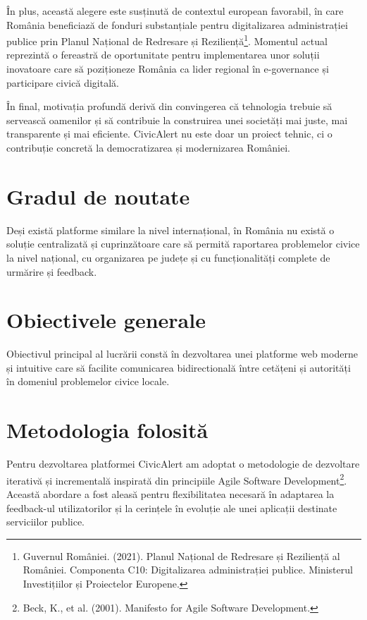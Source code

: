 \documentclass[12pt,a4paper]{report}
\begin{document}
În plus, această alegere este susținută de contextul european favorabil, în care România beneficiază de fonduri substanțiale pentru digitalizarea administrației publice prin Planul Național de Redresare și Reziliență\footnote{Guvernul României. (2021). Planul Național de Redresare și Reziliență al României. Componenta C10: Digitalizarea administrației publice. Ministerul Investițiilor și Proiectelor Europene.}. Momentul actual reprezintă o fereastră de oportunitate pentru implementarea unor soluții inovatoare care să poziționeze România ca lider regional în e-governance și participare civică digitală.

În final, motivația profundă derivă din convingerea că tehnologia trebuie să servească oamenilor și să contribuie la construirea unei societăți mai juste, mai transparente și mai eficiente. CivicAlert nu este doar un proiect tehnic, ci o contribuție concretă la democratizarea și modernizarea României.
\section*{Gradul de noutate}

Deși există platforme similare la nivel internațional, în România nu există o soluție centralizată și cuprinzătoare care să permită raportarea problemelor civice la nivel național, cu organizarea pe județe și cu funcționalități complete de urmărire și feedback.

\section*{Obiectivele generale}

Obiectivul principal al lucrării constă în dezvoltarea unei platforme web moderne și intuitive care să facilite comunicarea bidirectională între cetățeni și autorități în domeniul problemelor civice locale.

\section*{Metodologia folosită}

Pentru dezvoltarea platformei CivicAlert am adoptat o metodologie de dezvoltare iterativă și incrementală  inspirată din principiile Agile Software Development\footnote{Beck, K., et al. (2001). Manifesto for Agile Software Development.}. Această abordare a fost aleasă pentru flexibilitatea necesară în adaptarea la feedback-ul utilizatorilor și la cerințele în evoluție ale unei aplicații destinate serviciilor publice.
\end{document}
